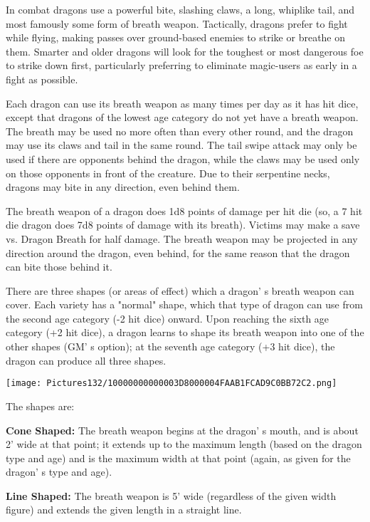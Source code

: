 \documentclass[a4paper,twoside,openany,10pt]{book}
\begin{document}
\begin{multicols}{2}
In combat dragons use a powerful bite, slashing claws, a long, whiplike tail, and most famously some form of breath weapon. Tactically, dragons prefer to fight while flying, making passes over ground-based enemies to strike or breathe on them. Smarter and older dragons will look for the toughest or most dangerous foe to strike down first, particularly preferring to eliminate magic-users as early in a fight as possible.

Each dragon can use its breath weapon as many times per day as it has hit dice, except that dragons of the lowest age category do not yet have a breath weapon. The breath may be used no more often than every other round, and the dragon may use its claws and tail in the same round. The tail swipe attack may only be used if there are opponents behind the dragon, while the claws may be used only on those opponents in front of the creature. Due to their serpentine necks, dragons may bite in any direction, even behind them.

The breath weapon of a dragon does 1d8 points of damage per hit die (so, a 7 hit die dragon does 7d8 points of damage with its breath). Victims may make a save vs. Dragon Breath for half damage. The breath weapon may be projected in any direction around the dragon, even behind, for the same reason that the dragon can bite those behind it.

There are three shapes (or areas of effect) which a dragon' s breath weapon can cover. Each variety has a "normal" shape, which that type of dragon can use from the second age category (-2 hit dice) onward. Upon reaching the sixth age category (+2 hit dice), a dragon learns to shape its breath weapon into one of the other shapes (GM' s option); at the seventh age category (+3 hit dice), the dragon can produce all three shapes.


\begin{center}
	\texttt{[image: Pictures132/10000000000003D8000004FAAB1FCAD9C0BB72C2.png]}
\end{center}\medskip

The shapes are:

\textbf{Cone Shaped:} The breath weapon begins at the dragon' s mouth, and is about 2' wide at that point; it extends up to the maximum length (based on the dragon type and age) and is the maximum width at that point (again, as given for the dragon' s type and age).

\textbf{Line Shaped: } The breath weapon is 5' wide (regardless of the given width figure) and extends the given length in a straight line.


\end{multicols}
\end{document}

